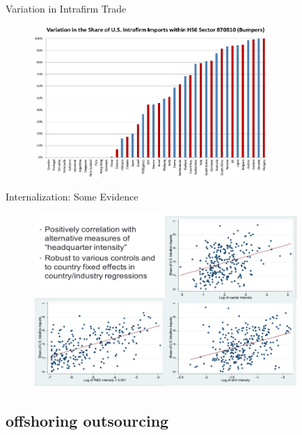 \documentclass[10pt,hyperref={CJKbookmarks=true},xcolor=dvipsnames,aspectratio=169]{beamer}
\begin{document}
\begin{frame}{Variation in Intrafirm Trade}


\begin{figure}


\begin{centering}
\includegraphics[width=9cm]{fig/fdi/lec7-10}
\par\end{centering}

\end{figure}

\end{frame}

\begin{frame}{Internalization: Some Evidence }


\begin{figure}


\begin{centering}
\includegraphics[width=10cm]{fig/fdi/lec7-11}
\par\end{centering}

\end{figure}

\end{frame}

\subsection{offshoring outsourcing}
\end{document}
